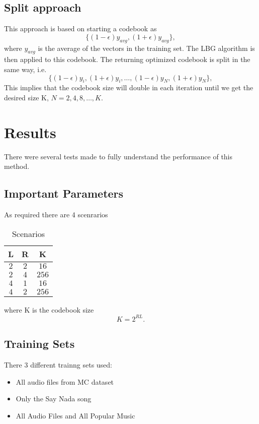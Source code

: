\documentclass[a4paper, 11pt]{article}
\begin{document}
		\subsection{Split approach}
				This approach is based on starting a codebook as 
				\begin{equation}
					\{(1-\epsilon)y_{avg}, (1+\epsilon)y_{avg}\},
				\end{equation}
				where $ y_{avg} $ is the average of the vectors in the training set.
				The LBG algorithm is then applied to this codebook.
				The returning optimized codebook is split in the same way, i.e.
				\begin{equation}
					\{(1-\epsilon)y_i, (1+\epsilon)y_i, \ldots, (1-\epsilon)y_N, (1+\epsilon)y_N \}, 
				\end{equation}
				This implies that the codebook size will double in each iteration until we get the desired size K, $ N=2,4,8, \ldots,K $.			
		
	
	\section{Results}
		There were several tests made to fully understand the performance of this method.
		
		\subsection{Important Parameters}
			As required there are 4 scenrarios
			\begin{table}[H]
				\centering
				\begin{tabular}{c|c|c}
					\textbf{L} 		& \textbf{R} 	& \textbf{K} 	\\ \hline
					$ 2 $			& $ 2 $ 		& $ 16 $	  	\\ \hline
					$ 2 $			& $ 4 $ 	  	& $ 256 $ 		\\ \hline	
					$ 4 $			& $ 1 $ 		& $ 16 $ 		\\ \hline	
					$ 4 $			& $ 2 $			& $	256 $ 		\\
				\end{tabular}
				\caption{Scenarios}
				\label{table:Scenarios}
			\end{table}
		where K is the codebook size
		\begin{equation}
			K = 2^{RL}.
		\end{equation} 
		
		
		\subsection{Training Sets}
			There 3 different trainng sets used:
			\begin{itemize}
				\item All audio files from MC dataset
				\item Only the Say Nada song
				\item All Audio Files and All Popular Music
			\end{itemize}
				
\end{document}
